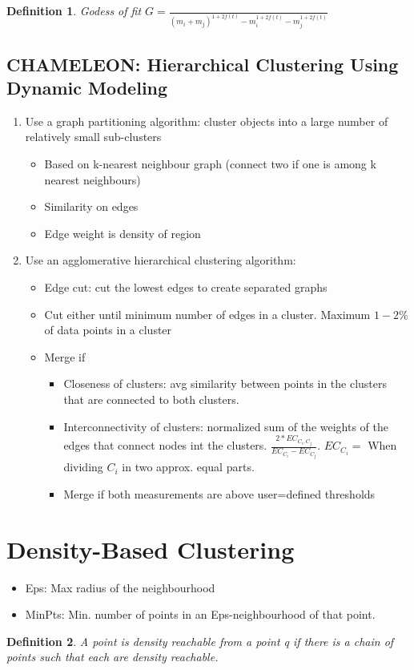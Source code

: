 \documentclass[a4paper]{article}
\newtheorem{definition}{Definition}
\begin{document}
\begin{definition}
	Godess of fit $G = \frac{}{(m_i+m_j)^{1+2f(t)} - m_i^{1+2f(t)} - m_j^{1+2f(t)}}$
\end{definition}
\subsection{CHAMELEON: Hierarchical Clustering Using Dynamic Modeling}
\begin{enumerate}
	\item Use a graph partitioning algorithm: cluster objects into a large
		number of relatively small sub-clusters
		\begin{itemize}
			\item Based on k-nearest neighbour graph (connect two if
				one is among k nearest neighbours)
			\item Similarity on edges
			\item Edge weight is density of region
		\end{itemize}
	\item Use an agglomerative hierarchical clustering algorithm:
		\begin{itemize}
			\item Edge cut: cut the lowest edges to create separated
				graphs
			\item Cut either until minimum number of edges in a
				cluster. Maximum $1-2\%$ of data points in a
				cluster
			\item Merge if
				\begin{itemize}
					\item Closeness of clusters: avg
						similarity between points in the
						clusters that are connected to
						both clusters.
					\item Interconnectivity of clusters:
						normalized sum of the weights of
						the edges that connect nodes int
						the clusters.
						$\frac{2*EC_{C_i,C_j}}{EC_{C_i}-EC_{C_j}}$.
						$EC_{C_i}=$ When dividing
						$C_i$ in two approx. equal
						parts.
					\item Merge if both measurements are
						above user=defined thresholds
				\end{itemize}
		\end{itemize}
\end{enumerate}
\section{Density-Based Clustering}
\begin{itemize}
	\item Eps: Max radius of the neighbourhood
	\item MinPts: Min. number of points in an Eps-neighbourhood of that
		point.
\end{itemize}
\begin{definition}
	A point is density reachable from a point q if there is a chain of
	points such that each are density reachable.
\end{definition}
\end{document}
